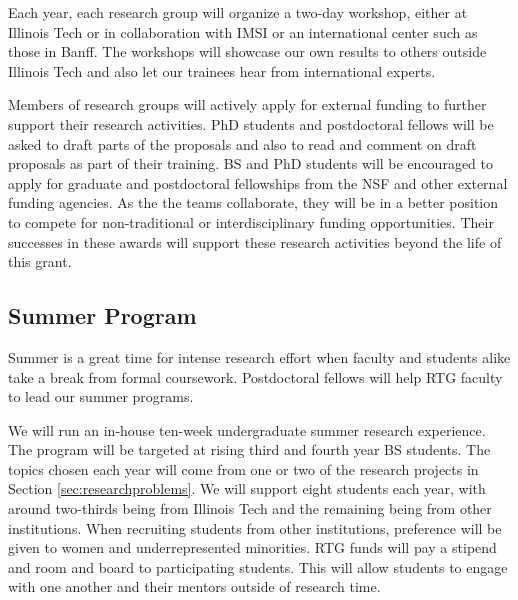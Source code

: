 \documentclass[11pt]{NSFamsart}
\begin{document}
Each year, each research group will organize a two-day workshop, either at Illinois Tech or in collaboration with IMSI or an international center such as those in Banff.  The workshops will showcase our own results to others outside Illinois Tech and also let our trainees hear from international experts.

Members of research groups will actively apply for external funding to further support their research activities.  PhD students and postdoctoral fellows will be asked to draft parts of the proposals and also to read and comment on draft proposals as part of their training.  BS and PhD students will be encouraged to apply for graduate and postdoctoral fellowships from the NSF and other external funding agencies.  As the the teams collaborate, they will be in a better position to compete for  non-traditional or interdisciplinary funding opportunities.  Their successes in these awards will support these research activities beyond the life of this grant.



\subsection{Summer Program}    \label{sec:summer}

Summer is a great time for intense research effort when faculty and students alike take a break from formal coursework.  Postdoctoral fellows will help RTG faculty to lead our  summer programs.

We will run an in-house ten-week undergraduate summer research experience.  The program will be targeted at rising third and fourth year BS students.  The topics chosen each year will come from one or two of the research projects in Section \ref{sec:researchproblems}.  We will support eight students each year, with around two-thirds being from Illinois Tech and the remaining being from other institutions.  When recruiting students from other institutions, preference will be given to women and underrepresented minorities.  RTG funds
will pay a stipend and room and board to participating students.  This will allow students to engage with one another and their mentors outside of research time.  
\end{document}
